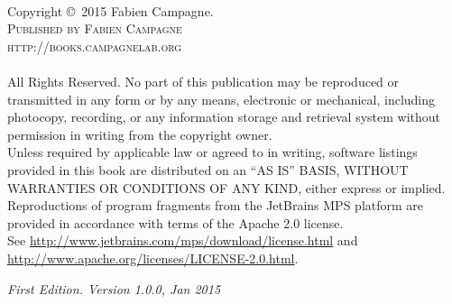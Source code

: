 \documentclass[11pt,fleqn]{book} %
\begin{document}
\ifthenelse {\boolean{includeCover}}{

\begingroup
\thispagestyle{empty}
\AddToShipoutPicture*{\put(0,0)
{\texttt{[image: Pictures/coverVolume1.png]}}} %
\mbox{}
\endgroup
} {
}

\newpage
~\vfill
\thispagestyle{empty}

\noindent Copyright \copyright\ 2015 Fabien Campagne.\\ %

\noindent \textsc{Published by Fabien Campagne}\\ %

\noindent \textsc{http://books.campagnelab.org}\\ %
\\
\noindent All Rights Reserved. No part of this publication may be reproduced or transmitted in any form or by any means, electronic or mechanical, including photocopy, recording, or any information storage and retrieval system without permission in writing from the copyright owner. \\
\noindent Unless required by applicable law or agreed to in writing, software listings provided in this book are distributed on an \textsc{``AS IS'' BASIS, WITHOUT WARRANTIES OR CONDITIONS OF ANY KIND}, either express or implied. \\
Reproductions of program fragments from the JetBrains MPS platform are provided in accordance with terms of the Apache 2.0 license. \\
See \url{http://www.jetbrains.com/mps/download/license.html} and\\
\url{http://www.apache.org/licenses/LICENSE-2.0.html}.
\vspace*{0.5cm}

\noindent \textit{
{First Edition.} Version 1.0.0, Jan 2015} %

{\newpage\thispagestyle{empty}\hbox{}}
\end{document}
